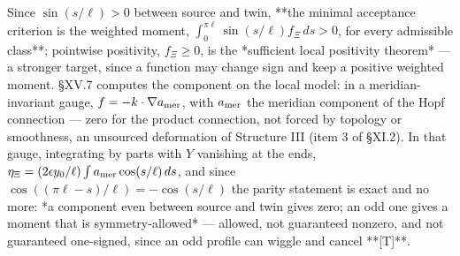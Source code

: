 Since $\sin(s/\ell)>0$ between source and twin, **the minimal acceptance criterion is the weighted moment, $\int_0^{\pi\ell}\sin(s/\ell)f_\Xi\,ds>0$, for every admissible class**; pointwise positivity, $f_\Xi\ge0$, is the *sufficient local positivity theorem* — a stronger target, since a function may change sign and keep a positive weighted moment. §XV.7 computes the component on the local model: in a meridian-invariant gauge, $f = -k\cdot\nabla a_{\rm mer}$, with $a_{\rm mer}$ the meridian component of the Hopf connection — zero for the product connection, not forced by topology or smoothness, an unsourced deformation of Structure III (item 3 of §XI.2). In that gauge, integrating by parts with $Y$ vanishing at the ends, $\eta_\Xi = (2\epsilon y_0/\ell)\int a_{\rm mer}\cos(s/\ell)\,ds$, and since $\cos((\pi\ell-s)/\ell) = -\cos(s/\ell)$ the parity statement is exact and no more: *a component even between source and twin gives zero; an odd one gives a moment that is symmetry-allowed* — allowed, not guaranteed nonzero, and not guaranteed one-signed, since an odd profile can wiggle and cancel **[T]**.

